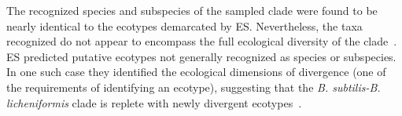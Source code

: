The recognized species and subspecies of the sampled clade were found to be nearly identical to the ecotypes demarcated by ES.
Nevertheless, the taxa recognized do not appear to encompass the full ecological diversity of the clade~\cite{connor2010ecology}.
ES predicted putative ecotypes not generally recognized as species or subspecies.
In one such case they identified the ecological dimensions of divergence (one of the requirements of identifying an ecotype), suggesting that the \emph{B. subtilis-B. licheniformis} clade is replete with newly divergent ecotypes~\cite{connor2010ecology}.

%

